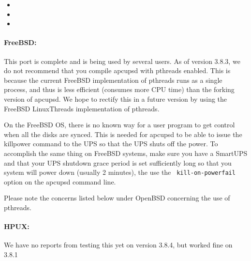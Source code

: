 \begin{itemize}
\item 
{}  
\item 
{}  
\item 
{} 
\end{itemize}

\label{FreeBSD}

\paragraph*{FreeBSD:}

\label{index-FreeBSD-36}
\label{index-OS_002c-FreeBSD-37}
This port is complete and is being used by several users. As of version 3.8.3,
we do not recommend that you compile apcupsd with pthreads enabled. This is
because the current FreeBSD implementation of pthreads runs as a single
process, and thus is less efficient (consumes more CPU time) than the forking
version of apcupsd. We hope to rectify this in a future version by using the
FreeBSD LinuxThreads implementation of pthreads.  

On the FreeBSD OS, there is no known way for a user program to get control
when all the disks are synced. This is needed for apcupsd to be able to issue
the killpower command to the UPS so that the UPS shuts off the power. To
accomplish the same thing on FreeBSD systems, make sure you have a SmartUPS
and that your UPS shutdown grace period is set sufficiently long so that you
system will power down (usually 2 minutes), the use the {\tt
kill-on-powerfail} option on the apcupsd command line.  

Please note the concerns listed below under OpenBSD concerning the use of
pthreads. 

\label{HPUX}

\paragraph*{HPUX:}

\label{index-HPUX-38}
\label{index-OS_002c-HPUX-39}
We have no reports from testing this yet on version 3.8.4, but worked fine on
3.8.1 

\label{NetBSD}

